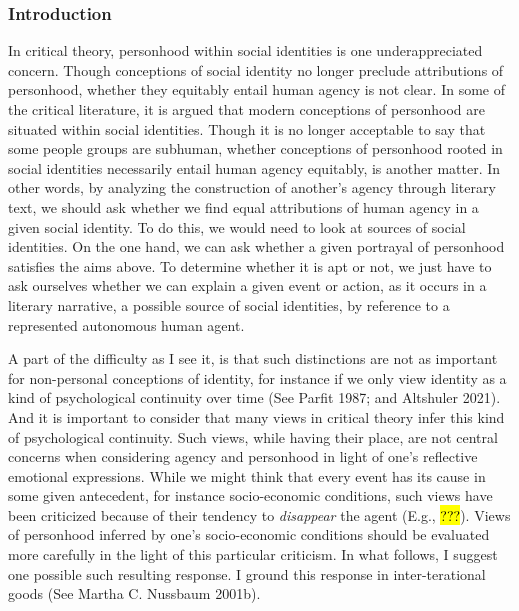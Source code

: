 \documentclass[
  letterpaper,
  DIV=11,
  numbers=noendperiod]{scrartcl}
\theoremstyle{remark}
\begin{document}
\subsubsection{Introduction}\label{introduction-1}

In critical theory, personhood within social identities is one
underappreciated concern. Though conceptions of social identity no
longer preclude attributions of personhood, whether they equitably
entail human agency is not clear. In some of the critical literature, it
is argued that modern conceptions of personhood are situated within
social identities. Though it is no longer acceptable to say that some
people groups are subhuman, whether conceptions of personhood rooted in
social identities necessarily entail human agency equitably, is another
matter. In other words, by analyzing the construction of another's
agency through literary text, we should ask whether we find equal
attributions of human agency in a given social identity. To do this, we
would need to look at sources of social identities. On the one hand, we
can ask whether a given portrayal of personhood satisfies the aims
above. To determine whether it is apt or not, we just have to ask
ourselves whether we can explain a given event or action, as it occurs
in a literary narrative, a possible source of social identities, by
reference to a represented autonomous human agent.

A part of the difficulty as I see it, is that such distinctions are not
as important for non-personal conceptions of identity, for instance if
we only view identity as a kind of psychological continuity over time
(See Parfit 1987; and Altshuler 2021). And it is important to consider
that many views in critical theory infer this kind of psychological
continuity. Such views, while having their place, are not central
concerns when considering agency and personhood in light of one's
reflective emotional expressions. While we might think that every event
has its cause in some given antecedent, for instance socio-economic
conditions, such views have been criticized because of their tendency to
\emph{disappear} the agent (E.g., \hl{???}). Views of personhood
inferred by one's socio-economic conditions should be evaluated more
carefully in the light of this particular criticism. In what follows, I
suggest one possible such resulting response. I ground this response in
inter-terational goods (See Martha C. Nussbaum 2001b).
\end{document}
